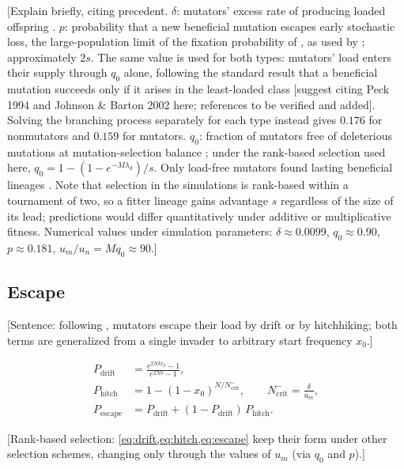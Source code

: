 [Explain briefly, citing precedent.
$\delta$: mutators' excess rate of producing loaded offspring \citep{johnson1999approach}.
$p$: probability that a new beneficial mutation escapes early stochastic loss, the large-population limit of the fixation probability of \citet{kimura1962probability}, as used by \citet{raynes2018sign}; approximately $2s$. The same value is used for both types: mutators' load enters their supply through $q_0$ alone, following the standard result that a beneficial mutation succeeds only if it arises in the least-loaded class [suggest citing Peck 1994 and Johnson \& Barton 2002 here; references to be verified and added]. Solving the branching process separately for each type instead gives $0.176$ for nonmutators and $0.159$ for mutators.
$q_0$: fraction of mutators free of deleterious mutations at mutation-selection balance \citep{haigh1978accumulation}; under the rank-based selection used here, $q_0 = 1 - (1 - e^{-M \lambda_d}) / s$.
Only load-free mutators found lasting beneficial lineages \citep{johnson1999beneficial,desai2011balance}.
Note that selection in the simulations is rank-based within a tournament of two, so a fitter lineage gains advantage $s$ regardless of the size of its lead; predictions would differ quantitatively under additive or multiplicative fitness.
Numerical values under simulation parameters: $\delta \approx 0.0099$, $q_0 \approx 0.90$, $p \approx 0.181$, $u_m / u_n = M q_0 \approx 90$.]

\subsection{Escape} \label{sec:model:escape}

[Sentence: following \citet{raynes2018sign}, mutators escape their load by drift or by hitchhiking; both terms are generalized from a single invader to arbitrary start frequency $x_0$.]

\begin{align}
  P_\mathrm{drift} &= \frac{e^{2 N \delta x_0} - 1}{e^{2 N \delta} - 1}, \label{eq:drift} \\
  P_\mathrm{hitch} &= 1 - (1 - x_0)^{N / N_\mathrm{crit}^{-}},
  \qquad N_\mathrm{crit}^{-} = \frac{\delta}{u_m}, \label{eq:hitch} \\
  P_\mathrm{escape} &= P_\mathrm{drift} + (1 - P_\mathrm{drift})\, P_\mathrm{hitch}. \label{eq:escape}
\end{align}

[Rank-based selection: \cref{eq:drift,eq:hitch,eq:escape} keep their form under other selection schemes, changing only through the values of $u_m$ (via $q_0$ and $p$).]

